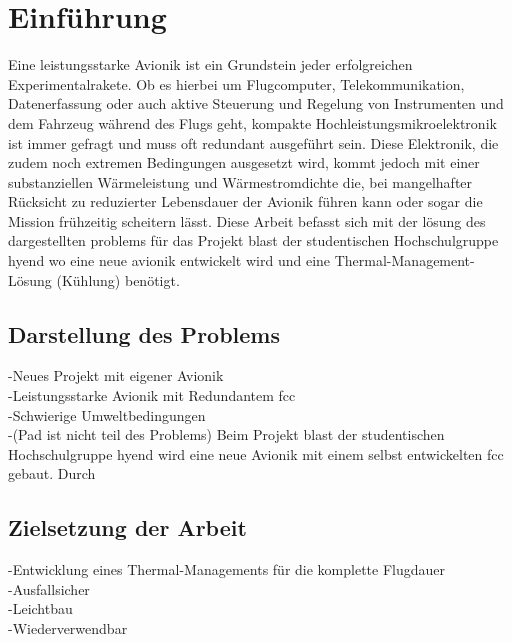 \chapter{Einführung}			
\label{sec:Introduction}


Eine leistungsstarke Avionik ist ein Grundstein jeder erfolgreichen Experimentalrakete. Ob es hierbei um Flugcomputer,
Telekommunikation, Datenerfassung oder auch aktive Steuerung und Regelung von
Instrumenten und dem Fahrzeug während des Flugs geht, kompakte Hochleistungsmikroelektronik ist immer gefragt und muss oft redundant ausgeführt sein.
Diese Elektronik, die zudem noch extremen Bedingungen ausgesetzt wird, kommt jedoch mit einer
substanziellen Wärmeleistung und Wärmestromdichte die, bei mangelhafter Rücksicht zu reduzierter Lebensdauer der Avionik führen
kann oder sogar die Mission frühzeitig scheitern lässt.
Diese Arbeit befasst sich mit der lösung des dargestellten problems für das Projekt \ac{blast} der studentischen Hochschulgruppe \ac{hyend}
wo eine neue avionik entwickelt wird und eine Thermal-Management-Lösung (Kühlung) benötigt.\\

\section{Darstellung des Problems}

-Neues Projekt mit eigener Avionik\\
-Leistungsstarke Avionik mit Redundantem \ac{fcc}\\
-Schwierige Umweltbedingungen\\
-(Pad ist nicht teil des Problems)
\newline
Beim Projekt \ac{blast} der studentischen Hochschulgruppe \ac{hyend} wird eine neue Avionik mit einem selbst entwickelten \ac{fcc} gebaut. Durch 

\section{Zielsetzung der Arbeit}

-Entwicklung eines Thermal-Managements für die komplette Flugdauer\\
-Ausfallsicher\\
-Leichtbau\\
-Wiederverwendbar

